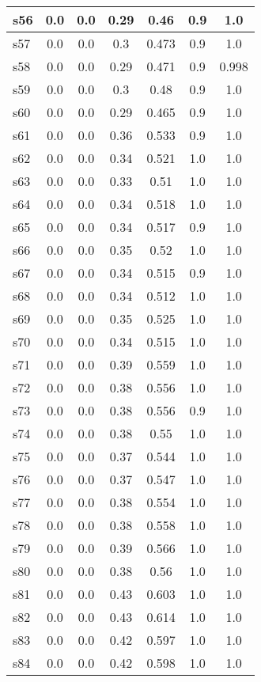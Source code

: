 \documentclass{article}
\begin{document}
\begin{tabular}{|l|c|c|c|c|c|c|}
\hline
s56 &0.0 & 0.0 & 0.29 & 0.46 & 0.9 & 1.0\\
\hline
s57 &0.0 & 0.0 & 0.3 & 0.473 & 0.9 & 1.0\\
\hline
s58 &0.0 & 0.0 & 0.29 & 0.471 & 0.9 & 0.998\\
\hline
s59 &0.0 & 0.0 & 0.3 & 0.48 & 0.9 & 1.0\\
\hline
s60 &0.0 & 0.0 & 0.29 & 0.465 & 0.9 & 1.0\\
\hline
s61 &0.0 & 0.0 & 0.36 & 0.533 & 0.9 & 1.0\\
\hline
s62 &0.0 & 0.0 & 0.34 & 0.521 & 1.0 & 1.0\\
\hline
s63 &0.0 & 0.0 & 0.33 & 0.51 & 1.0 & 1.0\\
\hline
s64 &0.0 & 0.0 & 0.34 & 0.518 & 1.0 & 1.0\\
\hline
s65 &0.0 & 0.0 & 0.34 & 0.517 & 0.9 & 1.0\\
\hline
s66 &0.0 & 0.0 & 0.35 & 0.52 & 1.0 & 1.0\\
\hline
s67 &0.0 & 0.0 & 0.34 & 0.515 & 0.9 & 1.0\\
\hline
s68 &0.0 & 0.0 & 0.34 & 0.512 & 1.0 & 1.0\\
\hline
s69 &0.0 & 0.0 & 0.35 & 0.525 & 1.0 & 1.0\\
\hline
s70 &0.0 & 0.0 & 0.34 & 0.515 & 1.0 & 1.0\\
\hline
s71 &0.0 & 0.0 & 0.39 & 0.559 & 1.0 & 1.0\\
\hline
s72 &0.0 & 0.0 & 0.38 & 0.556 & 1.0 & 1.0\\
\hline
s73 &0.0 & 0.0 & 0.38 & 0.556 & 0.9 & 1.0\\
\hline
s74 &0.0 & 0.0 & 0.38 & 0.55 & 1.0 & 1.0\\
\hline
s75 &0.0 & 0.0 & 0.37 & 0.544 & 1.0 & 1.0\\
\hline
s76 &0.0 & 0.0 & 0.37 & 0.547 & 1.0 & 1.0\\
\hline
s77 &0.0 & 0.0 & 0.38 & 0.554 & 1.0 & 1.0\\
\hline
s78 &0.0 & 0.0 & 0.38 & 0.558 & 1.0 & 1.0\\
\hline
s79 &0.0 & 0.0 & 0.39 & 0.566 & 1.0 & 1.0\\
\hline
s80 &0.0 & 0.0 & 0.38 & 0.56 & 1.0 & 1.0\\
\hline
s81 &0.0 & 0.0 & 0.43 & 0.603 & 1.0 & 1.0\\
\hline
s82 &0.0 & 0.0 & 0.43 & 0.614 & 1.0 & 1.0\\
\hline
s83 &0.0 & 0.0 & 0.42 & 0.597 & 1.0 & 1.0\\
\hline
s84 &0.0 & 0.0 & 0.42 & 0.598 & 1.0 & 1.0\\

\end{tabular}
\end{document}
